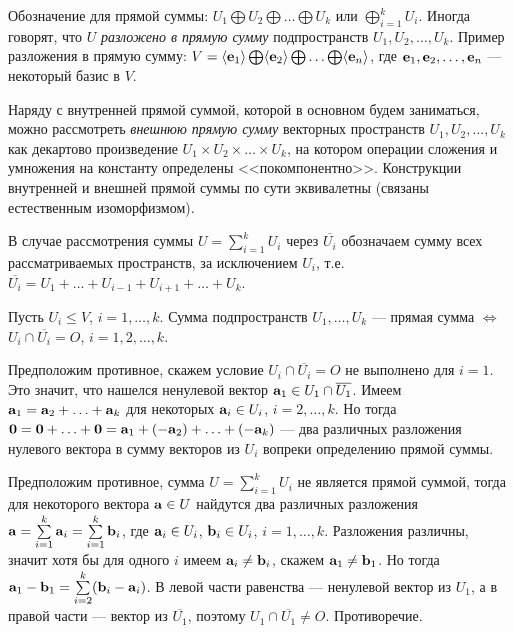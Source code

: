Обозначение для прямой суммы: $U_1 \bigoplus U_2 \bigoplus \ldots \bigoplus U_k$
или  $\bigoplus \limits_{i=1}^{k} U_i$.
Иногда говорят, что $U$ {\it разложено в прямую сумму} подпространств $U_1, U_2, \ldots , U_k$.
Пример разложения в прямую сумму: 
$V=\langle \mathbf{e}_1 \rangle \bigoplus \langle \mathbf{e}_2 \rangle \bigoplus \ldots
 \bigoplus \langle \mathbf{e}_n \rangle$, где  $\mathbf{e}_1, \mathbf{e}_2, \ldots , \mathbf{e}_n$ --- некоторый базис в $V$.


\otstup

{\footnotesize Наряду с внутренней прямой суммой, которой в основном будем заниматься, 
можно рассмотреть {\it внешнюю прямую сумму} векторных пространств $U_1, U_2, \ldots , U_k$ 
как декартово произведение $U_1\times  U_2\times \ldots \times U_k$, на котором 
операции сложения и умножения на константу определены <<покомпонентно>>. Конструкции
внутренней и внешней прямой суммы по сути эквивалетны (связаны естественным изоморфизмом).}



В случае рассмотрения суммы $U = \sum\limits_{i=1}^{k} U_i$ через $\overline{U_i}$ обозначаем сумму всех рассматриваемых пространств, 
за исключением $U_i$, т.е. $\overline{U_i}=U_1+\ldots +U_{i-1}+U_{i+1}+\ldots +U_k$.

\begin{theor}\label{t7_4_1}
Пусть $U_i\leq V$, $i=1, \ldots, k$.
Сумма подпространств $U_1, \ldots, U_k$ --- прямая сумма 
$\Leftrightarrow$
$U_i\cap \overline{U_i} = O$, $i=1, 2, \ldots , k$.
\end{theor}
\dok \dokright Предположим противное, скажем условие $U_i\cap \overline{U_i} = O$ не выполнено для $i=1$.
Это значит, что  нашелся ненулевой вектор $\mathbf{a}_1 \in U_1 \cap  \overline{U_1}$. 
Имеем $\mathbf{a}_1 = \mathbf{a}_2+\ldots + \mathbf{a}_k$ для некоторых $\mathbf{a}_i\in U_i$, $i=2, \ldots, k$.
Но тогда $\mathbf{0} = \mathbf{0} +\ldots + \mathbf{0} = \mathbf{a}_1 +(- \mathbf{a}_2)+\ldots + (-\mathbf{a}_k)$ --- два различных разложения нулевого вектора в сумму векторов из $U_i$
вопреки определению прямой суммы.

\dokleft Предположим противное, сумма $U=\sum\limits_{i=1}^{k} U_i$ не является прямой суммой, 
тогда для некоторого вектора $\mathbf{a}\in U$ найдутся два различных разложения
$\mathbf{a} = \sum\limits_{i=1}^{k} \mathbf{a}_i = \sum\limits_{i=1}^{k} \mathbf{b}_i$, где $\mathbf{a}_i\in U_i$, $\mathbf{b}_i\in U_i$, $i=1, \ldots, k$.
Разложения различны, значит хотя бы для одного $i$ имеем $\mathbf{a}_i\neq \mathbf{b}_i$, скажем $\mathbf{a}_1\neq \mathbf{b}_1$.
Но тогда $\mathbf{a}_1 - \mathbf{b}_1 = \sum\limits_{i=2}^{k} (\mathbf{b}_i-\mathbf{a}_i)$. В левой части равенства --- ненулевой вектор из $U_1$, а в правой части --- вектор из
$\overline{U_1}$, поэтому $U_1\cap \overline{U_1} \neq  O$. Противоречие.
\edok 

